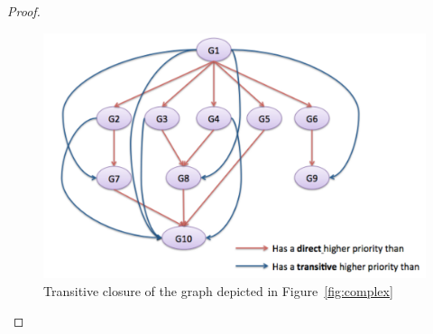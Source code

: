 \documentclass[11pt]{report}
\begin{document}
\begin{proof}
\begin{figure}[!ht]
      \begin{minipage}[c]{\textwidth}
      \centering
      \includegraphics[scale=0.5]{pictures/transitive.pdf}
      \end{minipage}
      \caption{Transitive closure of the graph depicted in Figure~\ref{fig:complex}}
      \label{fig:transitive} 
\end{figure}


\end{proof}
\end{document}
